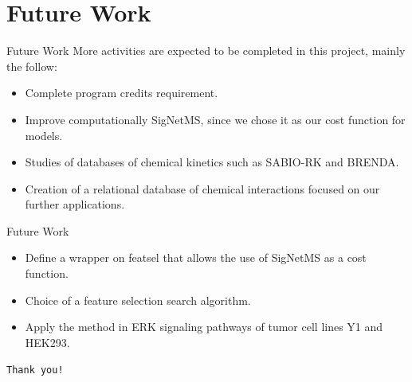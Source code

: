 \documentclass{beamer}
\begin{document}
\section{Future Work}

\begin{frame}{Future Work}
More activities are expected to be completed in this project, mainly the
follow:
\begin{itemize}
    \pause 
    \item{} Complete program credits requirement.
    \pause
    \item{} Improve computationally SigNetMS, since we chose it as our
        cost function for models.
    \pause
    \item{} Studies of databases of chemical kinetics 
        such as SABIO-RK and BRENDA.
    \pause
    \item{} Creation of a relational database of chemical 
        interactions focused on our further applications.
    \end{itemize}
\end{frame}


\begin{frame}{Future Work}
\begin{itemize}
    \item{} Define a wrapper on featsel that allows the use of SigNetMS
        as a cost function.
    \pause
    \item{} Choice of a feature selection search algorithm.
    \pause
    \item{} Apply the method in ERK signaling 
        pathways of tumor cell lines Y1 and HEK293.
\end{itemize}
\end{frame}

\begin{frame}{}
\begin{center}
    \texttt{Thank you!}
\end{center}
\end{frame}
\end{document}
